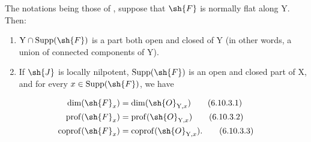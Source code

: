 \begin{proposition}[6.10.3]
\label{IV.6.10.3}
The notations being those of , suppose that $\sh{F}$ is normally flat along $\mathrm{Y}$. Then:
\begin{enumerate}[label=(\roman*)]
  \item $\mathrm{Y}\cap\operatorname{Supp}(\sh{F})$ is a part both open and closed of $\mathrm{Y}$ (in other words, a union of connected components of $\mathrm{Y}$).
  \item If $\sh{J}$ is locally nilpotent, $\operatorname{Supp}(\sh{F})$ is an open and closed part of $\mathrm{X}$, and for every $x\in\operatorname{Supp}(\sh{F})$, we have
\end{enumerate}
\begin{align}
  \dim(\sh{F}_x) &= \dim(\sh{O}_{\mathrm{Y},x}) \tag{6.10.3.1}\label{IV.6.10.3.1}\\
  \operatorname{prof}(\sh{F}_x) &= \operatorname{prof}(\sh{O}_{\mathrm{Y},x}) \tag{6.10.3.2}\label{IV.6.10.3.2}\\
  \operatorname{coprof}(\sh{F}_x) &= \operatorname{coprof}(\sh{O}_{\mathrm{Y},x}). \tag{6.10.3.3}\label{IV.6.10.3.3}
\end{align}
\end{proposition}

